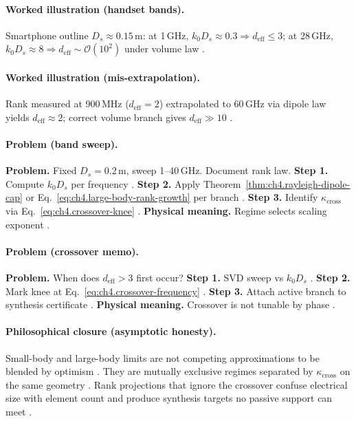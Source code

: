 \paragraph{Worked illustration (handset bands).}
Smartphone outline \(D_{s}\approx0.15\,\mathrm{m}\): at 1\,GHz, \(k_{0}D_{s}\approx0.3\Rightarrow d_{\mathrm{eff}}\le3\); at 28\,GHz,
\(k_{0}D_{s}\approx8\Rightarrow d_{\mathrm{eff}}\sim\mathcal{O}(10^{2})\) under volume law \cite{jackson1999,harrington2001,collin2001}.

\paragraph{Worked illustration (mis-extrapolation).}
Rank measured at 900\,MHz (\(d_{\mathrm{eff}}=2\)) extrapolated to 60\,GHz via dipole law yields \(d_{\mathrm{eff}}\approx2\); correct volume
branch gives \(d_{\mathrm{eff}}\gg10\) \cite{hansen1988,devaney2004,stratton1941}.

\paragraph{Problem (band sweep).}
\textbf{Problem.} Fixed \(D_{s}=0.2\,\mathrm{m}\), sweep 1--40\,GHz. Document rank law.
\textbf{Step 1.} Compute \(k_{0}D_{s}\) per frequency \cite{jackson1999}.
\textbf{Step 2.} Apply Theorem~\ref{thm:ch4.rayleigh-dipole-cap} or Eq.~\eqref{eq:ch4.large-body-rank-growth} per branch \cite{stratton1941,hansen1988}.
\textbf{Step 3.} Identify \(\kappa_{\mathrm{cross}}\) via Eq.~\eqref{eq:ch4.crossover-knee} \cite{harrington2001}.
\textbf{Physical meaning.} Regime selects scaling exponent \cite{devaney2004}.

\paragraph{Problem (crossover memo).}
\textbf{Problem.} When does \(d_{\mathrm{eff}}>3\) first occur?
\textbf{Step 1.} SVD sweep vs \(k_{0}D_{s}\) \cite{hansen1988,harrington2001}.
\textbf{Step 2.} Mark knee at Eq.~\eqref{eq:ch4.crossover-frequency} \cite{jackson1999}.
\textbf{Step 3.} Attach active branch to synthesis certificate \cite{stratton1941}.
\textbf{Physical meaning.} Crossover is not tunable by phase \cite{devaney2004}.

\paragraph{Philosophical closure (asymptotic honesty).}
Small-body and large-body limits are not competing approximations to be blended by optimism \cite{jackson1999,stratton1941,hansen1988}. They are
mutually exclusive regimes separated by \(\kappa_{\mathrm{cross}}\) on the same geometry \cite{harrington2001}. Rank projections that ignore the
crossover confuse electrical size with element count and produce synthesis targets no passive support can meet \cite{devaney2004}.

